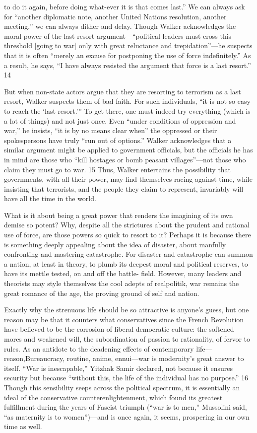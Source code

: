 to do it again, before doing what-ever it is that comes last.” We can always ask for “another diplomatic note, another United Nations resolution, another meeting,” we can always dither and delay. Though Walker acknowledges the moral power of the last resort argument—“political leaders must cross this threshold [going to war] only with great reluctance and trepidation”—he suspects that it is often “merely an excuse for postponing the use of force indefinitely.” As a result, he says, “I have always resisted the argument that force is a last resort.” {\color{blue} 14 } {\par} But when non-state actors argue that they are resorting to terrorism as a last resort, Walker suspects them of bad faith. For such individuals, “it is not so easy to reach the ‘last resort.’” To get there, one must indeed try everything (which is a lot of things) and not just once. Even “under conditions of oppression and war,” he insists, “it is by no means clear when” the oppressed or their spokespersons have truly “run out of options.” Walker acknowledges that a similar argument might be applied to government officials, but the officials he has in mind are those who “kill hostages or bomb peasant villages”—not those who claim they must go to war. {\color{blue} 15 } Thus, Walker entertains the possibility that governments, with all their power, may find themselves racing against time, while insisting that terrorists, and the people they claim to represent, invariably will have all the time in the world.{\par} What is it about being a great power that renders the imagining of its own demise so potent? Why, despite all the strictures about the prudent and rational use of force, are those powers so quick to resort to it? Perhaps it is because there is something deeply appealing about the idea of disaster, about manfully confronting and mastering catastrophe. For disaster and catastrophe can summon a nation, at least in theory, to plumb its deepest moral and political reserves, to have its mettle tested, on and off the battle- field. However, many leaders and theorists may style themselves the cool adepts of realpolitik, war remains the great romance of the age, the proving ground of self and nation.{\par} Exactly why the strenuous life should be so attractive is anyone’s guess, but one reason may be that it counters what conservatives since the French Revolution have believed to be the corrosion of liberal democratic culture: the softened mores and weakened will, the subordination of passion to rationality, of fervor to rules. As an antidote to the deadening effects of contemporary life—reason,Bureaucracy, routine, anime, ennui—war is modernity’s great answer to itself. “War is inescapable,” Yitzhak Samir declared, not because it ensures security but because “without this, the life of the individual has no purpose.” {\color{blue} 16 } Though this sensibility seeps across the political spectrum, it is essentially an ideal of the conservative counterenlightenment, which found its greatest fulfillment during the years of Fascist triumph (“war is to men,” Mussolini said, “as maternity is to women”)—and is once again, it seems, prospering in our own time as well. 